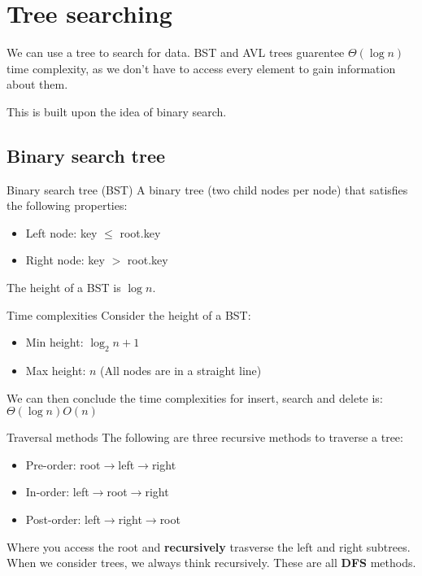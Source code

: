 \section{Tree searching}

We can use a tree to search for data. BST and AVL trees guarentee $\Theta(\log n)$ time complexity, as we don't have to access every element to gain information about them.

This is built upon the idea of binary search.

\subsection{Binary search tree}

\begin{definition}
    {Binary search tree (BST)}
    A binary tree (two child nodes per node) that satisfies the following properties:
    \begin{itemize}
        \item Left node: key $\leq$ root.key
        \item Right node: key $>$ root.key
    \end{itemize}
    The height of a BST is $\log n$.
\end{definition}

\begin{theorem}
    {Time complexities}
    Consider the height of a BST:
    \begin{itemize}
        \item Min height: $\log_2 n + 1$
        \item Max height: $n$ (All nodes are in a straight line)
    \end{itemize}
    We can then conclude the time complexities for insert, search and delete is: $\Theta(\log n) O(n)$
\end{theorem}

\begin{theorem}
    {Traversal methods}
    The following are three recursive methods to traverse a tree:
    \begin{itemize}
        \item Pre-order: root$\to$left$\to$right
        \item In-order: left$\to$root$\to$right
        \item Post-order: left$\to$right$\to$root
    \end{itemize}
    Where you access the root and \textbf{recursively} trasverse the left and right subtrees. When we consider trees, we always think recursively. These are all \textbf{DFS} methods.
\end{theorem}


